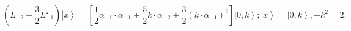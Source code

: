 \begin{equation}
(L_{-2}+\frac{3}{2}L_{-1}^{2})\left| \widetilde{x}\right\rangle =[\frac{1}{2}%
\alpha _{-1}\cdot \alpha _{-1}+\frac{5}{2}k\cdot \alpha _{-2}+\frac{3}{2}%
(k\cdot \alpha _{-1})^{2}]\left| 0,k\right\rangle ;\left| \widetilde{x}%
\right\rangle =\left| 0,k\right\rangle ,-k^{2}=2.  \tag{8}
\end{equation}

